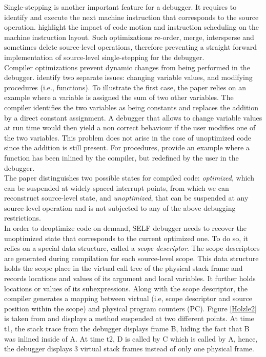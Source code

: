 Single-stepping is another important feature for a debugger. 
It requires to identify and execute the next machine instruction that corresponds to the source operation.
 highlight the impact of code motion and instruction scheduling on the machine instruction layout. 
Such optimizations re-order, merge, intersperse and sometimes delete source-level operations, therefore preventing a straight forward implementation of source-level single-stepping for the debugger.\\

Compiler optimizations prevent dynamic changes from being performed in the debugger.
 identify two separate issues: changing variable values, and modifying procedures (i.e., functions).
To illustrate the first case, the paper\cite{holzle1992debugging} relies on an example where a variable is assigned the sum of two other variables.
The compiler identifies the two variables as being constants and replaces the addition by a direct constant assignment.
A debugger that allows to change variable values at run time would then yield a non correct behaviour if the user modifies one of the two variables. 
This problem does not arise in the case of unoptimized code since the addition is still present. 
For procedures,  provide an example where a function has been inlined by the compiler, but redefined by the user in the debugger.\\

The paper\cite{holzle1992debugging} distinguishes two possible states for compiled code: \textit{optimized}, which can be suspended at widely-spaced interrupt points, from which we can reconstruct source-level state, and \textit{unoptimized}, that can be suspended at any source-level operation and is not subjected to any of the above debugging restrictions.\\

In order to deoptimize code on demand, SELF debugger needs to recover the unoptimized state that corresponds to the current optimized one. 
To do so, it relies on a special data structure, called a \textit{scope descriptor}. 
The scope descriptors are generated during compilation for each source-level scope. 
This data structure holds the scope place in the virtual call tree of the physical stack frame and records locations and values of its argument and local variables. 
It further holds locations or values of its subexpressions.
Along with the scope descriptor, the compiler generates a mapping between virtual (i.e, scope descriptor and source position within the scope) and physical program counters (PC).
Figure \ref{Holzle2} is taken from\cite{holzle1992debugging} and displays a method suspended at two different points. 
At time t1, the stack trace from the debugger displays frame B, hiding the fact that B was inlined inside of A.
At time t2, D is called by C which is called by A, hence, the debugger displays 3 virtual stack frames instead of only one physical frame.\\

